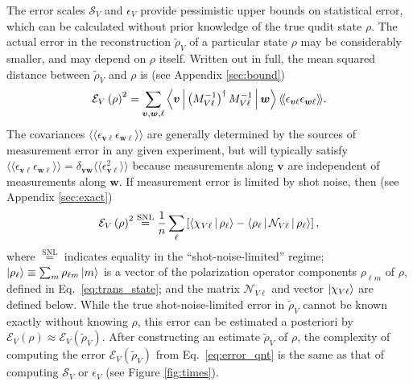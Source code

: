 \documentclass[nofootinbib,twocolumn]{revtex4-1}
\renewcommand{\t}{\text} %
\newcommand{\f}[2]{\dfrac{#1}{#2}} %
\newcommand{\p}[1]{\left(#1\right)} %
\renewcommand{\sp}[1]{\left[#1\right]} %
\newcommand{\bk}{\Braket} %
\newcommand{\bbk}[1]{\langle\!\langle #1 \rangle\!\rangle}
\newcommand{\E}{\mathcal{E}}
\newcommand{\N}{\mathcal{N}}
\renewcommand{\S}{\mathcal{S}}
\begin{document}
The error scales $\S_V$ and $\epsilon_V$ provide pessimistic upper bounds on statistical error, which can be calculated without prior knowledge of the true qudit state $\rho$.
The actual error in the reconstruction $\tilde\rho_V$ of a particular state $\rho$ may be considerably smaller, and may depend on $\rho$ itself.
Written out in full, the mean squared distance between $\tilde\rho_V$ and $\rho$ is (see Appendix \ref{sec:bound})
\begin{align}
  \E_V\p{\rho}^2 = \sum_{\bm v,\bm w,\ell}
  \bk{\bm v|\p{M_{V\ell}^{-1}}^\dag M_{V\ell}^{-1}|\bm w}
  \bbk{\epsilon_{\bm v\ell}\epsilon_{\bm w\ell}}.
  \label{eq:error_cls}
\end{align}
The covariances $\bbk{\epsilon_{\bm v\ell}\epsilon_{\bm w\ell}}$ are generally determined by the sources of measurement error in any given experiment, but will typically satisfy $\bbk{\epsilon_{\bm v\ell}\epsilon_{\bm w\ell}} = \delta_{\bm v\bm w}\bbk{\epsilon_{\bm v\ell}^2}$ because measurements along $\bm v$ are independent of measurements along $\bm w$.
If measurement error is limited by shot noise, then (see Appendix \ref{sec:exact})
\begin{align}
  \E_V\p{\rho}^2 \stackrel{\t{SNL}}{=} \f1n \sum_\ell
  \sp{\bk{\chi_{V\ell}|\rho_\ell}
    - \bk{\rho_\ell|\N_{V\ell}|\rho_\ell}},
  \label{eq:error_qnt}
\end{align}
where $\stackrel{\t{SNL}}{=}$ indicates equality in the ``shot-noise-limited'' regime; $\ket{\rho_\ell} \equiv \sum_m \rho_{\ell m}\ket{m}$ is a vector of the polarization operator components $\rho_{\ell m}$ of $\rho$, defined in Eq.~\eqref{eq:trans_state}; and the matrix $\N_{V\ell}$ and vector $\ket{\chi_{V\ell}}$ are defined below.
While the true shot-noise-limited error in $\tilde\rho_V$ cannot be known exactly without knowing $\rho$, this error can be estimated a posteriori by $\E_V\p{\rho}\approx\E_V\p{\tilde\rho_V}$.
After constructing an estimate $\tilde\rho_V$ of $\rho$, the complexity of computing the error $\E_V\p{\tilde\rho_V}$ from Eq.~\eqref{eq:error_qnt} is the same as that of computing $\S_V$ or $\epsilon_V$ (see Figure \ref{fig:times}).
\end{document}
